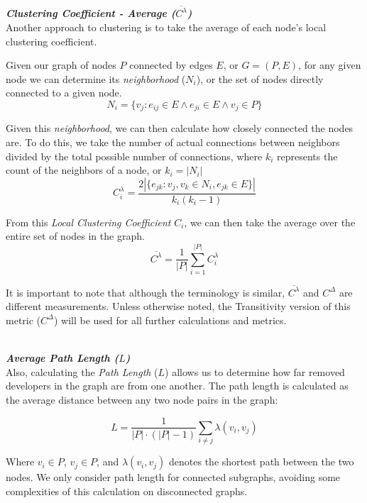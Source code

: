 \documentclass{proc}
\begin{document}
\noindent\\\textit{\textbf{Clustering Coefficient - Average ($\overline{C^{\lambda}}$)}}\\
Another approach to clustering is to take the average of each node's local clustering coefficient\cite{watts1998collective}.

Given our graph of nodes $P$ connected by edges $E$, or ${G=(P,E)}$, for any given node we can determine its \textit{neighborhood} ($N_i$), or the set of nodes directly connected to a given node.
\[ N_i = \{v_j : e_{ij} \in E \wedge e_{ji} \in E \wedge v_j \in P\} \]

Given this \textit{neighborhood}, we can then calculate how closely connected the nodes are. To do this, we take the number of actual connections between neighbors divided by the total possible number of connections, where $k_i$ represents the count of the neighbors of a node, or {$k_i = |N_i|$}
\[ C^{\lambda}_i = \frac{2|\{e_{jk}: v_j,v_k \in N_i, e_{jk} \in E\}|}{k_i(k_i-1)} \]

From this \textit{Local Clustering Coefficient} $C_i$, we can then take the average over the entire set of nodes in the graph.
\[ \overline{C^\lambda} = \frac{1}{|P|}\sum^{|P|}_{i=1}C^{\lambda}_i \]

It is important to note that although the terminology is similar\cite{uzzi2005collaboration}, $\overline{C^\lambda}$ and $C^\Delta$ are different measurements. Unless otherwise noted, the Transitivity version of this metric ($C^\Delta$) will be used for all further calculations and metrics.

\noindent\\\textit{\textbf{Average Path Length ($L$)}}\\
Also, calculating the \textit{Path Length} ($L$) allows us to determine how far removed developers in the graph are from one another. The path length is calculated as the average distance between any two node pairs in the graph:

\[L = \frac{1}{|P| \cdot (|P|-1)} \sum_{i \neq j}\lambda(v_i,v_j)\]

Where {$v_i \in P$}, {$v_j \in P$}, and {$\lambda(v_i,v_j)$} denotes the shortest path between the two nodes. We only consider path length for connected subgraphs, avoiding some complexities of this calculation on disconnected graphs\cite{boccaletti2006complex}.
\end{document}
